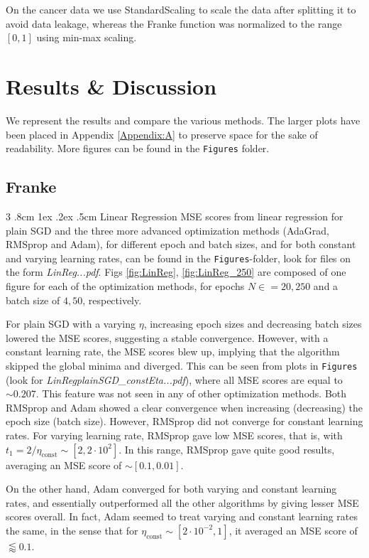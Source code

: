 \documentclass[%
reprint,s
amsmath,amssymb,
aps,
]{revtex4-2}
\makeatletter
\renewcommand{\subsubsection}{%
	\@startsection
	{subsubsection}%
	{3}%
	{\z@}%
	{.8cm \@plus1ex \@minus .2ex}%
	{.5cm}%
	{\normalfont\small\centering}%
}
\makeatother
\begin{document}
On the cancer data we use StandardScaling to scale the data after splitting it to avoid data leakage, whereas the Franke function was normalized to the range $[0,1]$ using min-max scaling.


\section{Results \& Discussion}
We represent the results and compare the various methods. The larger plots have been placed in Appendix \ref{Appendix:A} to preserve space for the sake of readability. More figures can be found in the \texttt{Figures} folder.

\subsection{Franke}
\subsubsection{Linear Regression}
MSE scores from linear regression for plain SGD and the three more advanced optimization methods (AdaGrad, RMSprop and Adam), for different epoch and batch sizes, and for both constant and varying learning rates, can be found in the \texttt{Figures}-folder, look for files on the form \emph{LinReg...pdf}. Figs \ref{fig:LinReg}, \ref{fig:LinReg_250} are composed of one figure for each of the optimization methods, for epochs \(N\in=20, 250\) and a batch size of \(4, 50\), respectively. 

For plain SGD with a varying \(\eta\), increasing epoch sizes and decreasing batch sizes lowered the MSE scores, suggesting a stable convergence. However, with a constant learning rate, the MSE scores blew up, implying that the algorithm skipped the global minima and diverged. This can be seen from plots in \texttt{Figures} (look for \emph{LinRegplainSGD\_constEta...pdf}), where all MSE scores are equal to \(\sim 0.207\). This feature was not seen in any of other optimization methods. Both RMSprop and Adam showed a clear convergence when increasing (decreasing) the epoch size (batch size). However, RMSprop did not converge for constant learning rates. For varying learning rate, RMSprop gave low MSE scores, that is, with \(t_{1} = 2/\eta_{\text{const}}\sim [2, 2\cdot 10^{2}]\). In this range, RMSprop gave quite good results, averaging an MSE score of \(\sim [0.1, 0.01]\). 

On the other hand, Adam converged for both varying and constant learning rates, and essentially outperformed all the other algorithms by giving lesser MSE scores overall. In fact, Adam seemed to treat varying and constant learning rates the same, in the sense that for \(\eta_{\text{const}}\sim[2\cdot10^{-2}, 1]\), it averaged an MSE score of \(\lessapprox 0.1\).
\end{document}
